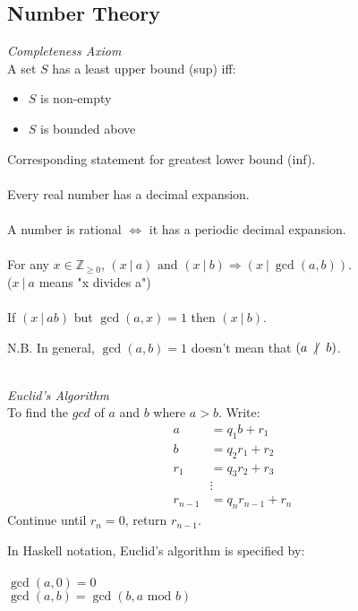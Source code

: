 \documentclass{scrartcl}
\newcommand{\Z}{\mathbb{Z}}
\begin{document}
\subsection{Number Theory}
\textit{Completeness Axiom}
\\
A set $ S $ has a least upper bound (sup) iff:
\begin{itemize}
\item $ S $ is non-empty
\item $ S $ is bounded above
\end{itemize}
Corresponding statement for greatest lower bound (inf).
\\\\
Every real number has a decimal expansion.
\\\\
A number is rational $ \Leftrightarrow $ it has a periodic decimal expansion.
\\\\
For any $ x \in \Z_{\geq 0} $, $ (x \ | \ a) \textrm{ and } (x \ | \ b) \Rightarrow (x \ | \ \gcd(a, b)) $.
\\
($ x \ | \ a  $ means "x divides a")
\\\\
If $  (x \ | \ ab) $ but $ \gcd(a, x) = 1 $ then $ (x \ | \ b ) $.
\\
\begin{tcolorbox}[breakable]
N.B. In general, $ \gcd(a, b) = 1 $ doesn't mean that $ (a \ \centernot| \ b) $.
\end{tcolorbox}
\noindent
\\
\textit{Euclid's Algorithm}
\\
To find the $ gcd $ of $ a $ and $ b $ where $ a > b $. Write:
\begin{align}
a & = q_{1} b + r_{1} \\
b & = q_{2} r_{1} + r_{2} \\
r_{1} & = q_{3} r_{2} + r_{3} \\
& \vdots \\
r_{n-1} & = q_{n} r_{n-1} + r_{n}
\end{align}
Continue until $ r_{n} = 0 $, return $ r_{n-1} $.
\\
\begin{tcolorbox}[breakable]
In Haskell notation, Euclid's algorithm is specified by:
\\\\
$ \gcd(a, 0) = 0 $
\\
$ \gcd(a, b) = \gcd(b, a \textrm{ mod } b) $
\end{tcolorbox}
\end{document}
